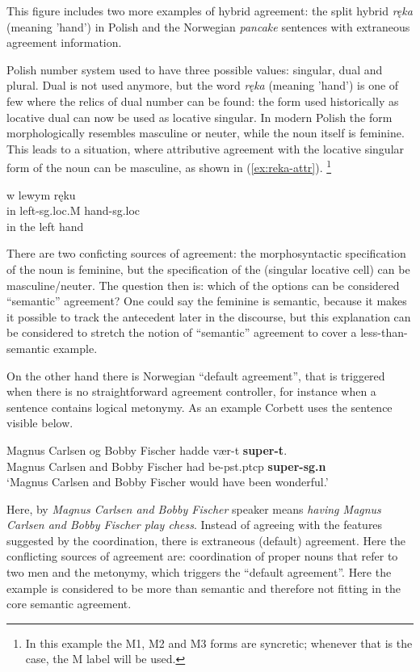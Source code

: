 This figure includes two more examples of hybrid agreement: the split hybrid \textsl{ręka} (meaning 'hand') in Polish and the Norwegian \textsl{pancake} sentences with extraneous agreement information.

Polish number system used to have three possible values: singular, dual and plural. Dual is not used anymore, but the word \textsl{ręka} (meaning 'hand') is one of few where the relics of dual number can be found: the form used historically as locative dual can now be used as locative singular. In modern Polish the form morphologically resembles masculine or neuter, while the noun itself is feminine. This leads to a situation, where attributive agreement with the locative singular form of the noun can be masculine, as shown in (\ref{ex:reka-attr}). \footnote{In this example the M1, M2 and M3 forms are syncretic; whenever that is the case, the M label will be used.}

\begin{exe}
  \ex\label{ex:reka-attr}
  \gll w lewym ręku\\
  in left-sg.loc.M hand-sg.loc\\
  \trans in the left hand
\end{exe}

There are two conficting sources of agreement: the morphosyntactic specification of the noun is feminine, but the specification of the (singular locative cell) can be masculine/neuter. The question then is: which of the options can be considered ``semantic'' agreement? One could say the feminine is semantic, because it makes it possible to track the antecedent later in the discourse, but this explanation can be considered to stretch the notion of ``semantic'' agreement to cover a less-than-semantic example.

On the other hand there is Norwegian ``default agreement'', that is triggered when there is no straightforward agreement controller, for instance when a sentence contains logical metonymy. As an example Corbett uses the sentence visible below.

\begin{exe}
  \ex\label{ex:norwegian-pancake}
  \gll Magnus Carlsen og Bobby Fischer hadde vær-t \textbf{super-t}.\\
  Magnus Carlsen and Bobby Fischer had be-pst.ptcp \textbf{super-sg.n}\\
  \glt ‘Magnus Carlsen and Bobby Fischer would have been wonderful.’
\end{exe}

Here, by \textsl{Magnus Carlsen and Bobby Fischer} speaker means \textsl{having Magnus Carlsen and Bobby Fischer play chess}. Instead of agreeing with the features suggested by the coordination, there is extraneous (default) agreement. Here the conflicting sources of agreement are: coordination of proper nouns that refer to two men and the metonymy, which triggers the ``default agreement''. Here the example is considered to be more than semantic and therefore not fitting in the core semantic agreement.

